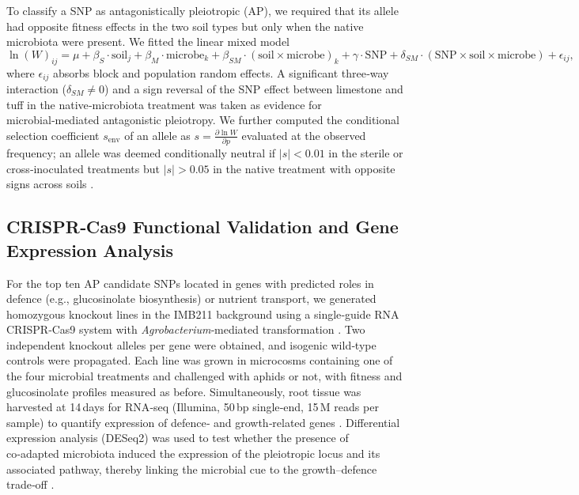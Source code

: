 \documentclass{article}
\begin{document}
To classify a SNP as antagonistically pleiotropic (AP), we required that its allele had opposite fitness effects in the two soil types but only when the native microbiota were present. We fitted the linear mixed model
\begin{equation}
\ln(W)_{ij} = \mu + \beta_S \cdot \text{soil}_j + \beta_M \cdot \text{microbe}_k + \beta_{SM} \cdot (\text{soil} \times \text{microbe})_k + \gamma \cdot \text{SNP} + \delta_{SM} \cdot (\text{SNP} \times \text{soil} \times \text{microbe}) + \epsilon_{ij},
\label{eq:model}
\end{equation}
where $\epsilon_{ij}$ absorbs block and population random effects. A significant three‑way interaction ($\delta_{SM} \neq 0$) and a sign reversal of the SNP effect between limestone and tuff in the native‑microbiota treatment was taken as evidence for microbial‑mediated antagonistic pleiotropy. We further computed the conditional selection coefficient $s_{\text{env}}$ of an allele as $s = \frac{\partial \ln W}{\partial p}$ evaluated at the observed frequency; an allele was deemed conditionally neutral if $|s| < 0.01$ in the sterile or cross‑inoculated treatments but $|s| > 0.05$ in the native treatment with opposite signs across soils \cite{anderson2011}.

\subsection{CRISPR‑Cas9 Functional Validation and Gene Expression Analysis}

For the top ten AP candidate SNPs located in genes with predicted roles in defence (e.g., glucosinolate biosynthesis) or nutrient transport, we generated homozygous knockout lines in the IMB211 background using a single‑guide RNA CRISPR‑Cas9 system with \emph{Agrobacterium}‑mediated transformation \cite{lawrenson2015}. Two independent knockout alleles per gene were obtained, and isogenic wild‑type controls were propagated. Each line was grown in microcosms containing one of the four microbial treatments and challenged with aphids or not, with fitness and glucosinolate profiles measured as before. Simultaneously, root tissue was harvested at 14 days for RNA‑seq (Illumina, 50 bp single‑end, 15 M reads per sample) to quantify expression of defence‑ and growth‑related genes \cite{di2017}. Differential expression analysis (DESeq2) was used to test whether the presence of co‑adapted microbiota induced the expression of the pleiotropic locus and its associated pathway, thereby linking the microbial cue to the growth–defence trade‑off \cite{love2014}.
\end{document}
